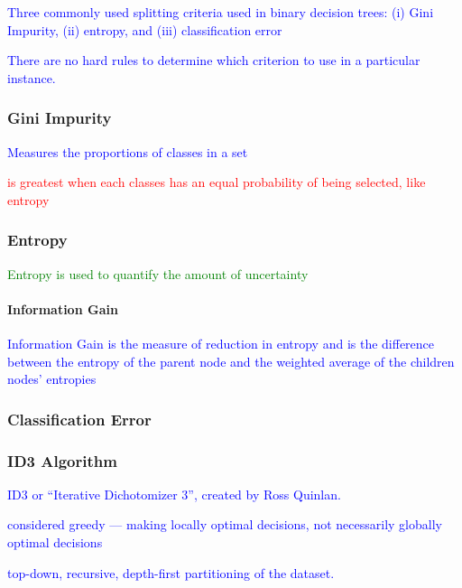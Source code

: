 \textcolor{blue}{Three commonly used splitting criteria used in binary decision trees: (i) Gini Impurity, (ii) entropy, and (iii) classification error}

\textcolor{blue}{There are no hard rules to determine which criterion to use in a particular instance.}

\subsubsection{Gini Impurity}

\textcolor{blue}{Measures the proportions of classes in a set}

\textcolor{red}{is greatest when each classes has an equal probability of being selected, like entropy}

\subsubsection{Entropy}

\textcolor{green}{Entropy is used to quantify the amount of uncertainty}

\paragraph{Information Gain}

\textcolor{blue}{Information Gain is the measure of reduction in entropy and is the difference between the entropy of the parent node and the weighted average of the children nodes' entropies}

\subsubsection{Classification Error}

\subsubsection{ID3 Algorithm}

\textcolor{blue}{ID3 or ``Iterative Dichotomizer 3'', created by Ross Quinlan.}

\textcolor{blue}{considered greedy --- making locally optimal decisions, not necessarily globally optimal decisions}

\textcolor{blue}{top-down, recursive, depth-first partitioning of the dataset.}

